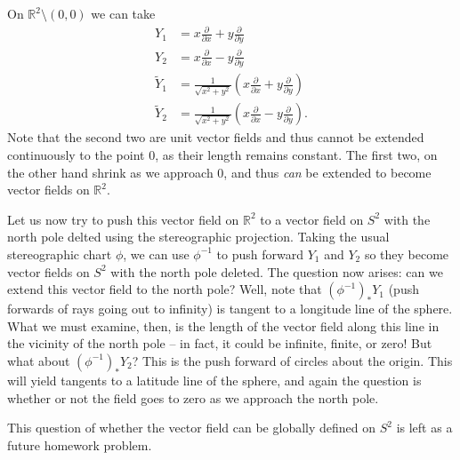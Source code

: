 \documentclass{../mathnotes}
\begin{document}
\begin{exmp}
    On $\mathbb{R}^2\setminus(0,0)$ we can take
    \begin{align*}
        Y_1&=x\frac{\partial}{\partial x}+y\frac{\partial}{\partial y}\\
        Y_2&=x\frac{\partial}{\partial x}-y\frac{\partial}{\partial y}\\
        \tilde{Y}_1&=\frac{1}{\sqrt{x^2+y^2}}\left(x\frac{\partial}{\partial x}+y\frac{\partial}{\partial y}\right)\\
        \tilde{Y}_2&=\frac{1}{\sqrt{x^2+y^2}}\left(x\frac{\partial}{\partial x}-y\frac{\partial}{\partial y}\right).
    \end{align*}
    Note that the second two are unit vector fields and thus cannot be extended continuously to the point 0, as their length remains constant.
    The first two, on the other hand shrink as we approach 0, and thus \textit{can} be extended to become vector fields on $\mathbb{R}^2$.

    Let us now try to push this vector field on $\mathbb{R}^2$ to a vector field on $S^2$ with the north pole delted using the stereographic projection.
    Taking the usual stereographic chart $\phi$, we can use $\phi^{-1}$ to push forward $Y_1$ and $Y_2$ so they become vector fields
    on $S^2$ with the north pole deleted. The question now arises: can we extend this vector field to the north pole? Well, note that
    $\left( \phi^{-1} \right)_* Y_1$ (push forwards of rays going out to infinity) is tangent to a longitude line of the sphere.
    What we must examine, then, is the length of the vector field along this line in the vicinity of the north pole -- in fact, it could be infinite, finite, or zero!
    But what about $\left( \phi^{-1} \right)_* Y_2$? This is the push forward of circles about the origin. This will yield tangents to
    a latitude line of the sphere, and again the question is whether or not the field goes to zero as we approach the north pole.

    This question of whether the vector field can be globally defined on $S^2$ is left as a future homework problem.
\end{exmp}
\end{document}
